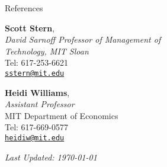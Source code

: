 \documentclass{resume} %
\begin{document}
\begin{rSection}{References}
\begin{multicols}{2}

{\bf Scott Stern}, \\
\emph{David Sarnoff Professor of Management of \\ Technology, MIT Sloan} \\
Tel: 617-253-6621 \\ 
\texttt{\href{mailto:sstern@mit.edu}{sstern@mit.edu}} 

\columnbreak

{\bf Heidi Williams}, \\
\emph{Assistant Professor} \\
MIT Department of Economics \\
Tel: 617-669-0577 \\
\texttt{\href{mailto:heidiw@mit.edu}{heidiw@mit.edu}}




\end{multicols}

\end{rSection}

%
\vspace{0.3cm}
\begin{center}
\emph{Last Updated: \today} 
\end{center}
\end{document}
